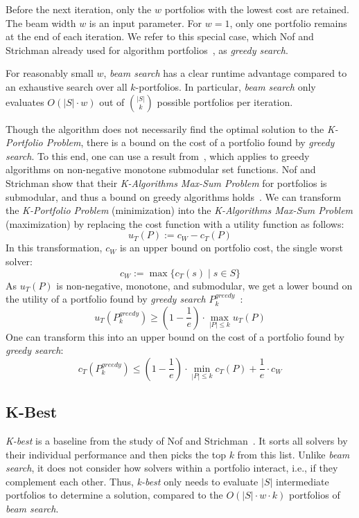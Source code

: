 \documentclass[a4paper,USenglish,pdfa]{lipics-v2021} %
\begin{document}
Before the next iteration, only the $w$ portfolios with the lowest cost are retained.
The beam width $w$ is an input parameter.
For $w=1$, only one portfolio remains at the end of each iteration.
We refer to this special case, which Nof and Strichman already used for algorithm portfolios~\cite{nof2020real}, as \emph{greedy search}.

For reasonably small $w$, \emph{beam search} has a clear runtime advantage compared to an exhaustive search over all $k$-portfolios.
In particular, \emph{beam search} only evaluates $O(|S| \cdot w)$ out of $\binom{|S|}{k}$ possible portfolios per iteration.

Though the algorithm does not necessarily find the optimal solution to the \emph{K-Portfolio Problem}, there is a bound on the cost of a portfolio found by \emph{greedy search}. 
To this end, one can use a result from~\cite{nemhauser1978analysis}, which applies to greedy algorithms on non-negative monotone submodular set functions.
Nof and Strichman show that their \emph{K-Algorithms Max-Sum Problem} for portfolios is submodular, and thus a bound on greedy algorithms holds~\cite{nof2020real}. 
We can transform the \emph{K-Portfolio Problem} (minimization) into the \emph{K-Algorithms Max-Sum Problem} (maximization) by replacing the cost function with a utility function as follows:%
\[
u_{T}(P) := c_W - c_{T}(P)
\]
In this transformation, $c_W$ is an upper bound on portfolio cost, the single worst solver:%
\[
c_W := \max\{c_T(s) \mid s \in S\}
\]
As $u_{T}(P)$ is non-negative, monotone, and submodular, we get a lower bound on the utility of a portfolio found by \emph{greedy search} $P_k^{greedy}$~\cite{nemhauser1978analysis,krause2014submodular}:%
\[
	u_{T}(P_k^{greedy}) \geq (1 - \frac{1}{e}) \cdot \max_{|P| \leq k}{u_{T}(P)}
\]
One can transform this into an upper bound on the cost of a portfolio found by \emph{greedy search}:%
\begin{equation}
	c_{T}(P_k^{greedy}) \leq (1 - \frac{1}{e}) \cdot \min_{|P| \leq k}{c_{T}(P)} + \frac{1}{e} \cdot c_W
	\label{eq:upper-bound}
\end{equation}

\subsection{K-Best}
\label{sec:approach:k-best}

\emph{K-best} is a baseline from the study of Nof and Strichman~\cite{nof2020real}. 
It sorts all solvers by their individual performance and then picks the top $k$ from this list.
Unlike \emph{beam search}, it does not consider how solvers within a portfolio interact, i.e., if they complement each other.
Thus, \emph{k-best} only needs to evaluate $|S|$ intermediate portfolios to determine a solution, compared to the $O(|S| \cdot w \cdot k)$ portfolios of \emph{beam search}.
\end{document}
